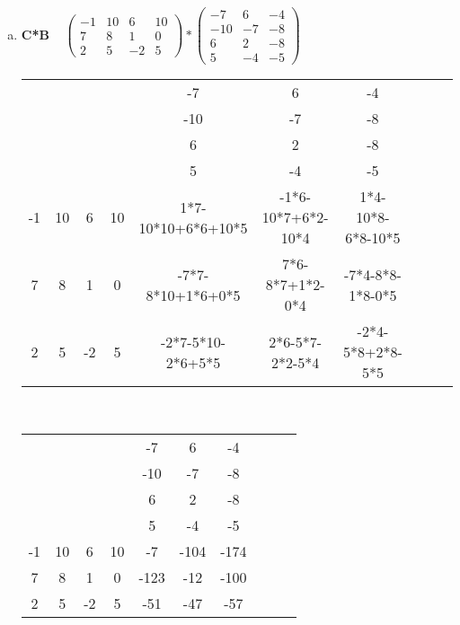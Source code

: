 \documentclass[10pt,ngerman]{scrartcl}
\begin{document}
\begin{enumerate}[1.]
\begin{enumerate}[(a)]
	\item \textbf{C*B}\newline
	~\newline
	\begin{math}
	\begin{pmatrix}-1 & 10 & 6 & 10 \\ 7 & 8 & 1 & 0 \\ 2 & 5 & -2 & 5 \end{pmatrix} * 
	\begin{pmatrix}-7 & 6 & -4 \\ -10 & -7 & -8 \\ 6 & 2 & -8 \\ 5 & -4 & -5\end{pmatrix} 
	\end{math}
	\newline~\newline~\newline
	\begin{tabular}{cccc|cccccc}
    ~ & ~ & ~ & ~ &         -7 & 6 & -4 \\ 
    ~ & ~ & ~ & ~ &         -10 & -7 & -8 \\ 
    ~ & ~ & ~ & ~ &         6 & 2 & -8 \\ 
    ~ & ~ & ~ & ~ &         5 & -4 & -5 \\ \toprule
    -1 & 10 & 6 & 10 &      1*7-10*10+6*6+10*5 & -1*6-10*7+6*2-10*4 & 1*4-10*8-6*8-10*5 \\
    7 & 8 & 1 & 0 &         -7*7-8*10+1*6+0*5 & 7*6-8*7+1*2-0*4 & -7*4-8*8-1*8-0*5  \\
    2 & 5 & -2 & 5 &        -2*7-5*10-2*6+5*5 & 2*6-5*7-2*2-5*4 & -2*4-5*8+2*8-5*5 
    \end{tabular}
	\newline~\newline~\newline
	\begin{tabular}{cccc|cccccc}
    ~ & ~ & ~ & ~ &         -7 & 6 & -4 \\ 
    ~ & ~ & ~ & ~ &         -10 & -7 & -8 \\ 
    ~ & ~ & ~ & ~ &         6 & 2 & -8 \\ 
    ~ & ~ & ~ & ~ &         5 & -4 & -5 \\ \toprule
    -1 & 10 & 6 & 10 &      -7 & -104 & -174 \\
    7 & 8 & 1 & 0 &         -123 & -12 & -100  \\
    2 & 5 & -2 & 5 &        -51 & -47 & -57
    \end{tabular}

\end{enumerate}
\end{enumerate}
\end{document}
